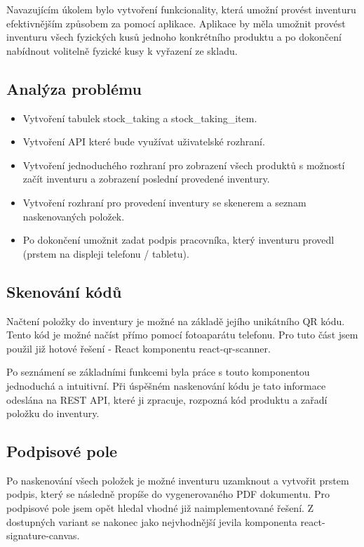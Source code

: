 Navazujícím úkolem bylo vytvoření funkcionality, která umožní provést inventuru efektivnějším způsobem za pomocí aplikace. Aplikace by měla umožnit provést inventuru všech fyzických kusů jednoho konkrétního produktu a po dokončení nabídnout volitelně fyzické kusy k vyřazení ze skladu. 

\subsection{Analýza problému}

\begin{itemize}
    \item Vytvoření tabulek stock\_taking a stock\_taking\_item.
    \item Vytvoření API které bude využívat uživatelské rozhraní.
    \item Vytvoření jednoduchého rozhraní pro zobrazení všech produktů s možností začít inventuru a zobrazení poslední provedené inventury.
    \item Vytvoření rozhraní pro provedení inventury se skenerem a seznam naskenovaných položek.
    \item Po dokončení umožnit zadat podpis pracovníka, který inventuru provedl (prstem na displeji telefonu / tabletu).
\end{itemize}

\subsection{Skenování kódů}

Načtení položky do inventury je možné na základě jejího unikátního QR kódu. Tento kód je možné načíst přímo pomocí fotoaparátu telefonu. Pro tuto část jsem použil již hotové řešení - React komponentu react-qr-scanner. 

Po seznámení se základními funkcemi byla práce s touto komponentou jednoduchá a intuitivní. Při úspěšném naskenování kódu je tato informace odeslána na REST API, které ji zpracuje, rozpozná kód produktu a zařadí položku do inventury. 

\subsection{Podpisové pole}

Po naskenování všech položek je možné inventuru uzamknout a vytvořit prstem podpis, který se následně propíše do vygenerovaného PDF dokumentu. Pro podpisové pole jsem opět hledal vhodné již naimplementované řešení. Z dostupných variant se nakonec jako nejvhodnější jevila komponenta react-signature-canvas. 

